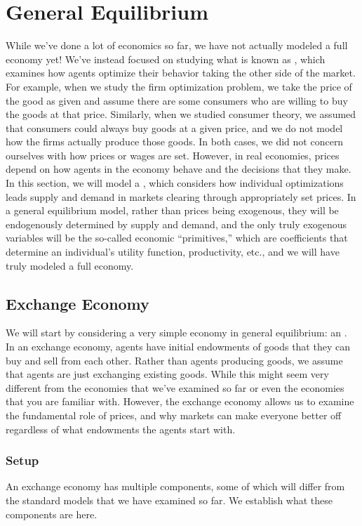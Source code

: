 \chapter{General Equilibrium}
While we've done a lot of economics so far, we have not actually modeled a full economy yet! We've instead focused on studying what is known as , which examines how agents optimize their behavior taking the other side of the market. For example, when we study the firm optimization problem, we take the price of the good as given and assume there are some consumers who are willing to buy the goods at that price. Similarly, when we studied consumer theory, we assumed that consumers could always buy goods at a given price, and we do not model how the firms actually produce those goods. In both cases, we did not concern ourselves with how prices or wages are set. However, in real economies, prices depend on how agents in the economy behave and the decisions that they make. In this section, we will model a , which considers how individual optimizations leads supply and demand in markets clearing through appropriately set prices. In a general equilibrium model, rather than prices being exogenous, they will be endogenously determined by supply and demand, and the only truly exogenous variables will be the so-called economic ``primitives,'' which are coefficients that determine an individual's utility function, productivity, etc., and we will have truly modeled a full economy. 

\section{Exchange Economy}
We will start by considering a very simple economy in general equilibrium: an . In an exchange economy, agents have initial endowments of goods that they can buy and sell from each other. Rather than agents producing goods, we assume that agents are just exchanging existing goods. While this might seem very different from the economies that we've examined so far or even the economies that you are familiar with. However, the exchange economy allows us to examine the fundamental role of prices, and why markets can make everyone better off regardless of what endowments the agents start with.

\subsection*{Setup}
An exchange economy has multiple components, some of which will differ from the standard models that we have examined so far. We establish what these components are here.

